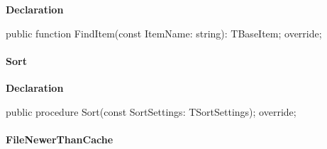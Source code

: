 \documentclass{report}
\newif\ifpdf
\begin{document}
\label{PasDoc_Items.TPasUnit-FindItem}
\begin{list}{}{
\setlength{\itemindent}{0cm}
\setlength{\listparindent}{0cm}
\setlength{\leftmargin}{\evensidemargin}
\addtolength{\leftmargin}{\tmplength}
\settowidth{\labelsep}{X}
\addtolength{\leftmargin}{\labelsep}
\setlength{\labelwidth}{\tmplength}
}
\item[\textbf{Declaration}\hfill]
\ifpdf
\begin{flushleft}
\fi
\begin{ttfamily}
public function FindItem(const ItemName: string): TBaseItem; override;\end{ttfamily}

\ifpdf
\end{flushleft}
\fi

\end{list}
\paragraph*{Sort}\hspace*{\fill}

\label{PasDoc_Items.TPasUnit-Sort}
\begin{list}{}{
\setlength{\itemindent}{0cm}
\setlength{\listparindent}{0cm}
\setlength{\leftmargin}{\evensidemargin}
\addtolength{\leftmargin}{\tmplength}
\settowidth{\labelsep}{X}
\addtolength{\leftmargin}{\labelsep}
\setlength{\labelwidth}{\tmplength}
}
\item[\textbf{Declaration}\hfill]
\ifpdf
\begin{flushleft}
\fi
\begin{ttfamily}
public procedure Sort(const SortSettings: TSortSettings); override;\end{ttfamily}

\ifpdf
\end{flushleft}
\fi

\end{list}
\paragraph*{FileNewerThanCache}\hspace*{\fill}
\end{document}
